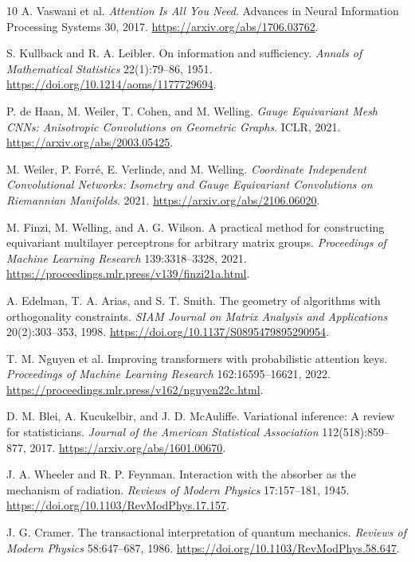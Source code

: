 \documentclass[11pt,letterpaper]{article}
\theoremstyle{remark}
\begin{document}
\begin{thebibliography}{10}
A. Vaswani et al.
\emph{Attention Is All You Need}.
Advances in Neural Information Processing Systems 30, 2017.
\url{https://arxiv.org/abs/1706.03762}.

S. Kullback and R. A. Leibler.
On information and sufficiency.
\emph{Annals of Mathematical Statistics} 22(1):79--86, 1951.
\url{https://doi.org/10.1214/aoms/1177729694}.

P. de Haan, M. Weiler, T. Cohen, and M. Welling.
\emph{Gauge Equivariant Mesh CNNs: Anisotropic Convolutions on Geometric Graphs}.
ICLR, 2021.
\url{https://arxiv.org/abs/2003.05425}.

M. Weiler, P. Forr\'e, E. Verlinde, and M. Welling.
\emph{Coordinate Independent Convolutional Networks: Isometry and Gauge Equivariant Convolutions on Riemannian Manifolds}.
2021.
\url{https://arxiv.org/abs/2106.06020}.

M. Finzi, M. Welling, and A. G. Wilson.
A practical method for constructing equivariant multilayer perceptrons for arbitrary matrix groups.
\emph{Proceedings of Machine Learning Research} 139:3318--3328, 2021.
\url{https://proceedings.mlr.press/v139/finzi21a.html}.

A. Edelman, T. A. Arias, and S. T. Smith.
The geometry of algorithms with orthogonality constraints.
\emph{SIAM Journal on Matrix Analysis and Applications} 20(2):303--353, 1998.
\url{https://doi.org/10.1137/S0895479895290954}.

T. M. Nguyen et al.
Improving transformers with probabilistic attention keys.
\emph{Proceedings of Machine Learning Research} 162:16595--16621, 2022.
\url{https://proceedings.mlr.press/v162/nguyen22c.html}.

D. M. Blei, A. Kucukelbir, and J. D. McAuliffe.
Variational inference: A review for statisticians.
\emph{Journal of the American Statistical Association} 112(518):859--877, 2017.
\url{https://arxiv.org/abs/1601.00670}.

J. A. Wheeler and R. P. Feynman.
Interaction with the absorber as the mechanism of radiation.
\emph{Reviews of Modern Physics} 17:157--181, 1945.
\url{https://doi.org/10.1103/RevModPhys.17.157}.

J. G. Cramer.
The transactional interpretation of quantum mechanics.
\emph{Reviews of Modern Physics} 58:647--687, 1986.
\url{https://doi.org/10.1103/RevModPhys.58.647}.
\end{thebibliography}
\end{document}
